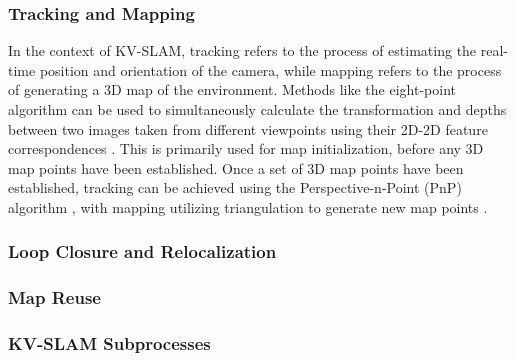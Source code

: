 \subsubsection{Tracking and Mapping}

In the context of KV-SLAM, tracking refers to the process of estimating the real-time position and orientation of the camera, while mapping refers to the process of generating a 3D map of the environment. Methods like the eight-point algorithm can be used to simultaneously calculate the transformation and depths between two images taken from different viewpoints using their 2D-2D feature correspondences \cite{longuet-higginsComputerAlgorithmReconstructing1981}\cite{hartleyDefenseEightpointAlgorithm1997}. This is primarily used for map initialization, before any 3D map points have been established. Once a set of 3D map points have been established, tracking can be achieved using the Perspective-n-Point (PnP) algorithm \cite{fischlerRandomSampleConsensus1981}, with mapping utilizing triangulation to generate new map points \cite{davisonRealtimeSimultaneousLocalisation2003}. 

\subsubsection{Loop Closure and Relocalization}

\subsubsection{Map Reuse}

\subsubsection{KV-SLAM Subprocesses}